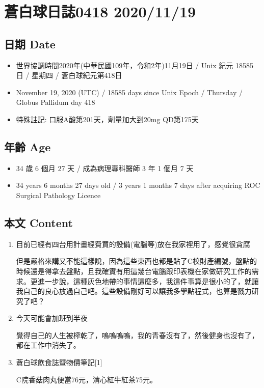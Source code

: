 \documentclass[
]{article}
\providecommand{\tightlist}{%
  \setlength{\itemsep}{0pt}\setlength{\parskip}{0pt}}
\begin{document}
\hypertarget{ux84bcux767dux7403ux65e5ux8a8c0418-20201119}{%
\section{蒼白球日誌0418
2020/11/19}\label{ux84bcux767dux7403ux65e5ux8a8c0418-20201119}}

\hypertarget{ux65e5ux671f-date-72}{%
\subsection{日期 Date}\label{ux65e5ux671f-date-72}}

\begin{itemize}
\tightlist
\item
  世界協調時間2020年(中華民國109年，令和2年)11月19日 / Unix 紀元 18585
  日 / 星期四 / 蒼白球紀元第418日
\item
  November 19, 2020 (UTC) / 18585 days since Unix Epoch / Thursday /
  Globus Pallidum day 418
\item
  特殊註記: 口服A酸第201天，劑量加大到20mg QD第175天
\end{itemize}

\hypertarget{ux5e74ux9f61-age-72}{%
\subsection{年齡 Age}\label{ux5e74ux9f61-age-72}}

\begin{itemize}
\tightlist
\item
  34 歲 6 個月 27 天 / 成為病理專科醫師 3 年 1 個月 7 天
\item
  34 years 6 months 27 days old / 3 years 1 months 7 days after
  acquiring ROC Surgical Pathology Licence
\end{itemize}

\hypertarget{ux672cux6587-content-72}{%
\subsection{本文 Content}\label{ux672cux6587-content-72}}

\begin{enumerate}
\def\labelenumi{\arabic{enumi}.}
\item
  目前已經有四台用計畫經費買的設備(電腦等)放在我家裡用了，感覺很貪腐

  但是嚴格來講又不能這樣說，因為這些東西也都是貼了C校財產編號，盤點的時候還是得拿去盤點，且我確實有用這幾台電腦跟印表機在家做研究工作的需求。更進一步說，這種灰色地帶的事情這麼多，我這件事算是很小的了，就讓我自己的良心放過自己吧。這些設備剛好可以讓我多學點程式，也算是戮力研究了吧？
\item
  今天可能會加班到半夜

  覺得自己的人生被榨乾了，嗚嗚嗚嗚，我的青春沒有了，然後健身也沒有了，都在工作中消失了。
\item
  蒼白球飲食誌暨物價筆記{[}1{]}

  C院香菇肉丸便當76元，清心紅牛紅茶75元。
\end{enumerate}
\end{document}
